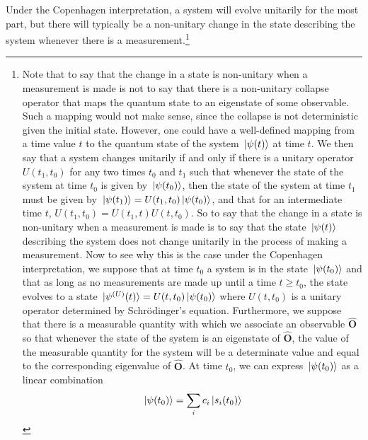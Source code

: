 Under the Copenhagen interpretation, a system will evolve unitarily for the most part, but there will typically be a non-unitary change in the state describing the system whenever there is a measurement.\footnote{Note that to say that the change in a state is non-unitary when a measurement is made is not to say that there is a non-unitary collapse operator that maps the quantum state to an eigenstate of some observable. Such a mapping would not make sense, since the collapse is not deterministic given the initial state. However, one could have a well-defined mapping from a time value $t$ to the quantum state of the system $\ket*{\psi(t)}$ at time $t$. We then say that a system changes unitarily if and only if there is a unitary operator $U(t_1,t_0)$ for any two times $t_0$ and $t_1$ such that whenever the state of the system at time $t_0$ is given by $\ket*{\psi(t_0)}$, then the state of the system at time $t_1$ must be given by $\ket*{\psi(t_1)}=U(t_1, t_0)\ket*{\psi(t_0)}$, and that for an intermediate time $t$, $U(t_1,t_0)=U(t_1, t)U(t, t_0).$ So to say that the change in a state is non-unitary when a measurement is made is to say that the state $\ket*{\psi(t)}$ describing the system does not change unitarily in the process of making a measurement. Now to see why this is the case under the Copenhagen interpretation, we suppose that at time $t_0$ a system is in the state $\ket*{\psi(t_0)}$ and that as long as no measurements are made up until a time $t\geq t_0$, the state evolves to a state $\ket*{\psi^{(U)}(t)}=U(t,t_0)\ket*{\psi(t_0)}$ where $U(t,t_0)$ is a unitary operator determined by Schr\"{o}dinger's equation. Furthermore, we suppose that there is a measurable quantity with which we associate an observable $\hat{\bm{O}}$ so that whenever the state of the system is an eigenstate of $\hat{\bm{O}}$, the value of the measurable quantity for the system will be a determinate value and equal to the corresponding eigenvalue of $\hat{\bm{O}}$. At time $t_0$, we can express $\ket*{\psi(t_0)}$ as a linear combination
  $$\ket*{\psi(t_0)}=\sum_i c_i\ket*{s_i(t_0)}$$
}
